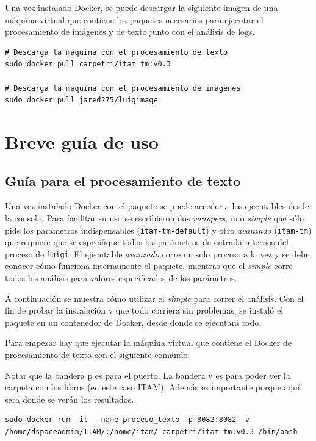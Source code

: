 Una vez instalado Docker,  se puede descargar la siguiente imagen de una máquina virtual que contiene los paquetes necesarios para ejecutar el procesamiento de imágenes y de texto junto con el análisis de logs.

\begin{lstlisting}
# Descarga la maquina con el procesamiento de texto
sudo docker pull carpetri/itam_tm:v0.3

# Descarga la maquina con el procesamiento de imagenes
sudo docker pull jared275/luigimage
\end{lstlisting}



\section{Breve guía de uso}
\subsection{Guía para el procesamiento de texto}

Una vez instalado Docker con  el paquete se puede acceder a los ejecutables desde la consola. Para facilitar su uso se escribieron dos \emph{wrappers}, uno \emph{simple} que sólo pide los parámetros indispensables (\texttt{itam-tm-default}) y otro \emph{avanzado} (\texttt{itam-tm}) que requiere que se especifique todos los parámetros de entrada internos del proceso de \texttt{luigi}. El ejecutable \emph{avanzado} corre un solo proceso a la vez y se debe conocer cómo funciona internamente el paquete, mientras que el \emph{simple} corre todos los análisis para valores especificados de los parámetros.

A continuación se muestra cómo utilizar el \emph{simple} para correr el análisis. Con el fin de probar la instalación y que todo corriera sin problemas, se instaló el paquete en un contenedor de Docker, desde donde se ejecutará todo.

Para empezar hay que ejecutar la máquina virtual que contiene el Docker de procesamiento de texto con el siguiente comando:


 Notar que la bandera \-p es para el puerto. La bandera \-v es para poder ver la carpeta con los libros (en este caso ITAM). Además es importante porque aquí será donde se verán los resultados.
\begin{lstlisting}
sudo docker run -it --name proceso_texto -p 8082:8082 -v /home/dspaceadmin/ITAM/:/home/itam/ carpetri/itam_tm:v0.3 /bin/bash

\end{lstlisting}

